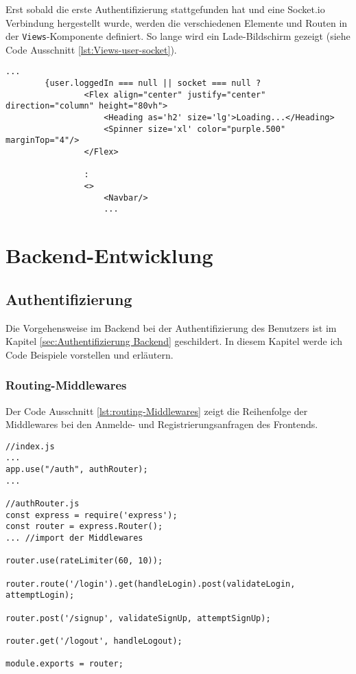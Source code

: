 Erst sobald die erste Authentifizierung stattgefunden hat und eine Socket.io Verbindung hergestellt wurde, werden die verschiedenen Elemente und Routen in der \verb|Views|-Komponente definiert. So lange wird ein Lade-Bildschirm gezeigt (siehe Code Ausschnitt \ref{lst:Views-user-socket}).

\begin{lstlisting}[style=codeStyle, caption={Ausschnitt der \textit{Views}-Komponente}, label={lst:Views-user-socket}]
		   ...
        {user.loggedIn === null || socket === null ?
                <Flex align="center" justify="center" direction="column" height="80vh">
                    <Heading as='h2' size='lg'>Loading...</Heading>
                    <Spinner size='xl' color="purple.500" marginTop="4"/>
                </Flex>

                :
                <>
                    <Navbar/>
                    ...
\end{lstlisting}


    \section{Backend-Entwicklung}
    \subsection{Authentifizierung}
Die Vorgehensweise im Backend bei der Authentifizierung des Benutzers ist im Kapitel \ref{sec:Authentifizierung Backend} geschildert. In diesem Kapitel werde ich Code Beispiele vorstellen und erläutern.

\subsubsection{Routing-Middlewares}
Der Code Ausschnitt \ref{lst:routing-Middlewares} zeigt die Reihenfolge der Middlewares bei den Anmelde- und Registrierungsanfragen des Frontends.
\begin{lstlisting}[style=codeStyle, caption={Ausschnitt aus index.js und die Datei authRouter.js}, label={lst:routing-Middlewares}]
//index.js
...
app.use("/auth", authRouter);
...

//authRouter.js
const express = require('express');
const router = express.Router();
... //import der Middlewares

router.use(rateLimiter(60, 10));

router.route('/login').get(handleLogin).post(validateLogin, attemptLogin);

router.post('/signup', validateSignUp, attemptSignUp);

router.get('/logout', handleLogout);

module.exports = router;
\end{lstlisting}


